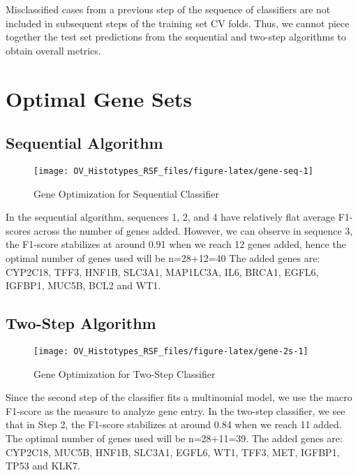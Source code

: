 \documentclass[
]{report}
\begin{document}
Misclassified cases from a previous step of the sequence of classifiers are not included in subsequent steps of the training set CV folds. Thus, we cannot piece together the test set predictions from the sequential and two-step algorithms to obtain overall metrics.

\section{Optimal Gene Sets}\label{optimal-gene-sets}

\subsection{Sequential Algorithm}\label{sequential-algorithm-1}

\begin{figure}[H]

{\centering \texttt{[image: OV\_Histotypes\_RSF\_files/figure-latex/gene-seq-1]} 

}

\caption{Gene Optimization for Sequential Classifier}\label{fig:gene-seq}
\end{figure}

In the sequential algorithm, sequences 1, 2, and 4 have relatively flat average F1-scores across the number of genes added. However, we can observe in sequence 3, the F1-score stabilizes at around 0.91 when we reach 12 genes added, hence the optimal number of genes used will be n=28+12=40 The added genes are: CYP2C18, TFF3, HNF1B, SLC3A1, MAP1LC3A, IL6, BRCA1, EGFL6, IGFBP1, MUC5B, BCL2 and WT1.

\subsection{Two-Step Algorithm}\label{two-step-algorithm-1}

\begin{figure}[H]

{\centering \texttt{[image: OV\_Histotypes\_RSF\_files/figure-latex/gene-2s-1]} 

}

\caption{Gene Optimization for Two-Step Classifier}\label{fig:gene-2s}
\end{figure}

Since the second step of the classifier fits a multinomial model, we use the macro F1-score as the measure to analyze gene entry. In the two-step classifier, we see that in Step 2, the F1-score stabilizes at around 0.84 when we reach 11 added. The optimal number of genes used will be n=28+11=39. The added genes are: CYP2C18, MUC5B, HNF1B, SLC3A1, EGFL6, WT1, TFF3, MET, IGFBP1, TP53 and KLK7.
\end{document}
